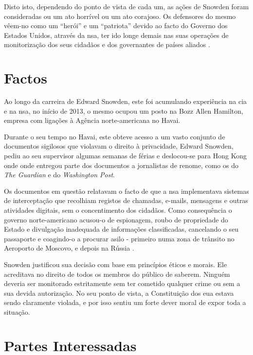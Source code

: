 \documentclass[a4paper,12pt]{article}
\begin{document}
Disto isto, dependendo do ponto de vista de cada um, as ações de Snowden foram consideradas ou um ato horrível ou um ato corajoso. Os defensores do mesmo vêem-no como um “herói” e um “patriota” devido ao facto do Governo dos Estados Unidos, através da \acrshort{nsa}, ter ido longe demais nas suas operações de monitorização dos seus cidadãos e dos governantes de países aliados \cite{tavani}. 

\section{Factos}


Ao longo da carreira de Edward Snowden, este foi acumulando experiência na \acrshort{cia} e na \acrshort{nsa}, no início de 2013, o mesmo ocupou um posto na Bozz Allen Hamilton, empresa com ligações à Agência norte-americana no Havai.

Durante o seu tempo no Havai, este obteve acesso a um vasto conjunto de documentos sigilosos que violavam o direito à privacidade, Edward Snowden, pediu ao seu supervisor algumas semanas de férias e deslocou-se para Hong Kong onde onde entregou parte dos documentos a jornalistas de renome, como os do \textit{The Guardian} e do \textit{Washington Post}.

Os documentos em questão relatavam o facto de que a \acrshort{nsa} implementava sistemas de interceptação que recolhiam registos de chamadas, e-mails, mensagens e outras atividades digitais, sem o concentimento dos cidadãos. Como consequência o governo norte-americano acusou-o de espionagem, roubo de propriedade do Estado e divulgação inadequada de informações classificadas, cancelando o seu passaporte e coagindo-o a procurar asilo - primeiro numa zona de trânsito no Aeroporto de Moscovo, e depois na Rússia \cite{pilati}.

Snowden justificou sua decisão com base em princípios éticos e morais. Ele acreditava no direito de todos os membros do público de saberem. Ninguém deveria ser monitorado estritamente sem ter cometido qualquer crime ou sem a sua devida autorização. No seu ponto de vista, a Constituição dos \acrshort{eua} estava sendo claramente violada, e por isso sentiu um forte dever moral de expor toda a situação. \cite{permanentrecord}




\section{Partes Interessadas}
\end{document}
